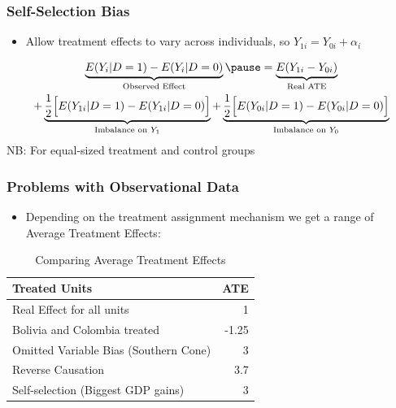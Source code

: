 \documentclass[xcolor=x11names,compress]{beamer}\usepackage[]{graphicx}\usepackage[]{color}
\renewcommand{\(}{\begin{columns}}
\renewcommand{\)}{\end{columns}}
\newcommand{\<}[1]{\begin{column}{#1}}
\renewcommand{\>}{\end{column}}
\begin{document}
\begin{frame}
\frametitle{Self-Selection Bias}
\begin{itemize}
\item Allow treatment effects to vary across individuals, so $Y_{1i} = Y_{0i} + \alpha_i$
\end{itemize}
\pause
\begin{multline}
\underbrace{E(Y_i|D=1)-E(Y_i|D=0)}_\text{Observed Effect} \pause = \underbrace{E(Y_{1i} - Y_{0i})}_\text{Real ATE} \\ + \underbrace{\frac{1}{2}\Big[ E(Y_{1i}|D=1) - E(Y_{1i}|D=0) \Big]}_\text{Imbalance on $Y_1$} + \underbrace{\frac{1}{2}\Big[ E(Y_{0i}|D=1) - E(Y_{0i}|D=0) \Big]}_\text{Imbalance on $Y_0$}
\end{multline}
\footnotesize
NB: For equal-sized treatment and control groups
\normalsize
\end{frame}



\begin{frame}
\frametitle{Problems with Observational Data}
\begin{itemize}
\item Depending on the treatment assignment mechanism we get a range of Average Treatment Effects:
\end{itemize}
\begin{table}[htbp]
  \centering
  \caption{Comparing Average Treatment Effects}
    \begin{tabular}{|l|r|}
    \hline
    \textbf{Treated Units} & \multicolumn{1}{l|}{\textbf{ATE}} \bigstrut\\
    \hline
    Real Effect for all units & 1 \bigstrut\\
    \hline
    Bolivia and Colombia treated & -1.25 \bigstrut\\
    \hline
    Omitted Variable Bias (Southern Cone) & 3 \bigstrut\\
    \hline
    Reverse Causation & 3.7 \bigstrut\\
    \hline
    Self-selection (Biggest GDP gains) & 3 \bigstrut\\
    \hline
    \end{tabular}%
\end{table}%
\end{frame}
\end{document}
